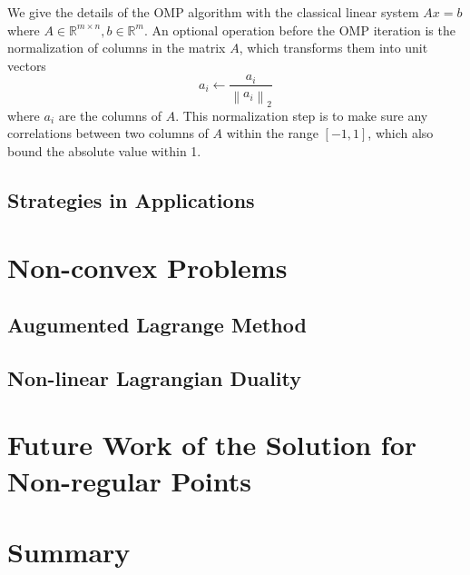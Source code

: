 \par We give the details of the OMP algorithm with the classical linear system $Ax = b$ where $A \in \mathbb{R}^{m \times n}, b \in \mathbb{R}^{m}$. An optional operation before the OMP iteration is the normalization of columns in the matrix $A$, which transforms them into unit vectors
\begin{equation}
    a_{i} \leftarrow \frac{a_{i}}{\left\|a_{i}\right\|_{2}}
\end{equation}
where $a_i$ are the columns of $A$. This normalization step is to make sure any correlations between two columns of $A$ within the range $[-1, 1]$, which also bound the absolute value within 1. 


\subsection{Strategies in Applications}

\section{Non-convex Problems}
\label{sec:non-convex-sol}
\subsection{Augumented Lagrange Method}
\subsection{Non-linear Lagrangian Duality}



\section{Future Work of the Solution for Non-regular Points}
\label{sec:futurework-non}


\section{Summary}

